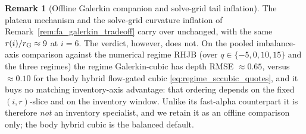 \documentclass[11pt,a4paper]{article}
\theoremstyle{plain}
\theoremstyle{definition}
\newtheorem{remark}{Remark}[section]
\begin{document}
\begin{remark}[Offline Galerkin companion and solve-grid tail inflation]
\label{rem:regime_galerkin}
The plateau mechanism and the solve-grid curvature inflation of
Remark~\ref{rem:fa_galerkin_tradeoff} carry over unchanged, with the same
\(r(i)/r_{\rm G}\approx9\) at \(i=6\).  The verdict, however, does not.  On the
pooled imbalance-axis comparison against the numerical regime RHJB (over
\(q\in\{-5,0,10,15\}\) and the three regimes) the regime Galerkin-cubic has
depth RMSE \(\approx0.65\), versus \(\approx0.10\) for the body hybrid
flow-gated cubic \eqref{eq:regime_sccubic_quotes}, and it buys no matching
inventory-axis advantage: that ordering depends on the fixed
\((i,r)\)-slice and on the inventory window.  Unlike its fast-alpha
counterpart it is therefore \emph{not} an inventory specialist, and we retain
it as an offline comparison only; the body hybrid cubic is the balanced
default.
\end{remark}
\end{document}
